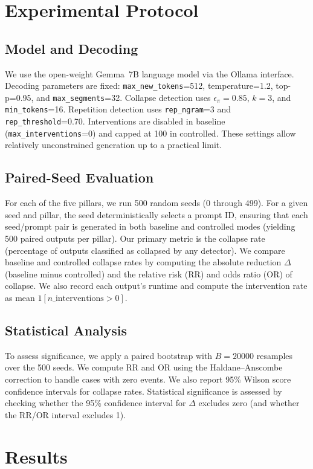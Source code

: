 \documentclass{article}
\begin{document}
\section{Experimental Protocol}
\subsection{Model and Decoding}
We use the open-weight Gemma~7B language model via the Ollama interface. Decoding parameters are fixed: \texttt{max\_new\_tokens}=512, temperature=1.2, top-p=0.95, and \texttt{max\_segments}=32. Collapse detection uses $\epsilon_{\pi}=0.85$, $k=3$, and \texttt{min\_tokens}=16. Repetition detection uses \texttt{rep\_ngram}=3 and \texttt{rep\_threshold}=0.70. Interventions are disabled in baseline (\texttt{max\_interventions}=0) and capped at 100 in controlled. These settings allow relatively unconstrained generation up to a practical limit.

\subsection{Paired-Seed Evaluation}
For each of the five pillars, we run 500 random seeds (0 through 499). For a given seed and pillar, the seed deterministically selects a prompt ID, ensuring that each seed/prompt pair is generated in both baseline and controlled modes (yielding 500 paired outputs per pillar). Our primary metric is the collapse rate (percentage of outputs classified as collapsed by any detector). We compare baseline and controlled collapse rates by computing the absolute reduction $\Delta$ (baseline minus controlled) and the relative risk (RR) and odds ratio (OR) of collapse. We also record each output's runtime and compute the intervention rate as mean $1[n\_{\text{interventions}}>0]$.

\subsection{Statistical Analysis}
To assess significance, we apply a paired bootstrap with $B=20000$ resamples over the 500 seeds. We compute RR and OR using the Haldane--Anscombe correction to handle cases with zero events. We also report 95\% Wilson score confidence intervals for collapse rates. Statistical significance is assessed by checking whether the 95\% confidence interval for $\Delta$ excludes zero (and whether the RR/OR interval excludes 1).

\section{Results}
\end{document}
